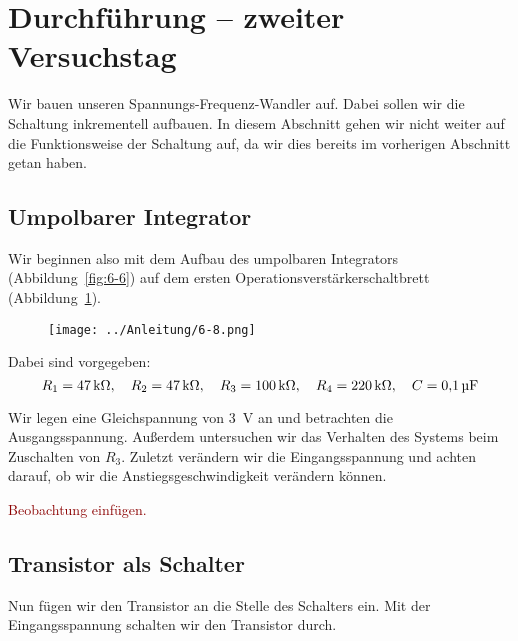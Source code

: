 
\FloatBarrier
\section{Durchführung – zweiter Versuchstag}

Wir bauen unseren Spannungs-Frequenz-Wandler auf. Dabei sollen wir die
Schaltung inkrementell aufbauen. In diesem Abschnitt gehen wir nicht weiter auf
die Funktionsweise der Schaltung auf, da wir dies bereits im vorherigen
Abschnitt getan haben.

\FloatBarrier
\subsection{Umpolbarer Integrator}

Wir beginnen also mit dem Aufbau des umpolbaren Integrators
(Abbildung~\ref{fig:6-6}) auf dem ersten Operationsverstärkerschaltbrett
(Abbildung~\ref{fig:6-8}).

\begin{figure}[htbp]
	\centering
	\texttt{[image: ../Anleitung/6-8.png]}
	\caption{%
		\cite[Abbildung~6.8]{physik313-Anleitung}
	}
	\label{fig:6-8}
\end{figure}

Dabei sind vorgegeben:
\[
	R_1 = \SI{47}{\kilo\ohm} ,\quad
	R_2 = \SI{47}{\kilo\ohm} ,\quad
	R_3 = \SI{100}{\kilo\ohm} ,\quad
	R_4 = \SI{220}{\kilo\ohm} ,\quad
	C = \SI{.1}{\micro\farad}
\]

Wir legen eine Gleichspannung von \SI{3}{\volt} an und betrachten die
Ausgangsspannung. Außerdem untersuchen wir das Verhalten des Systems beim
Zuschalten von $R_3$. Zuletzt verändern wir die Eingangsspannung und achten
darauf, ob wir die Anstiegsgeschwindigkeit verändern können.

\textcolor{darkred}{Beobachtung einfügen.}

\FloatBarrier
\subsection{Transistor als Schalter}

Nun fügen wir den Transistor an die Stelle des Schalters ein. Mit der
Eingangsspannung schalten wir den Transistor durch.

